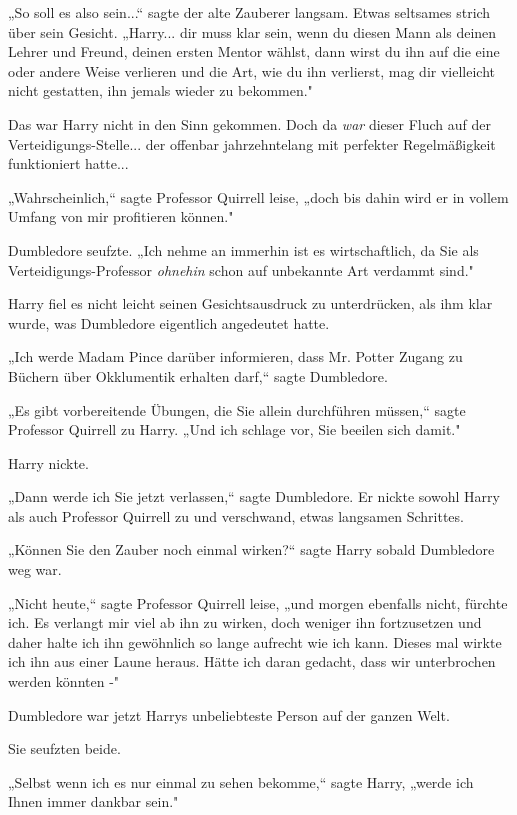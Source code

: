 {„So soll es also sein...“ sagte der alte Zauberer langsam. Etwas seltsames strich über sein Gesicht. „Harry... dir muss klar sein, wenn du diesen Mann als deinen Lehrer und Freund, deinen ersten Mentor wählst, dann wirst du ihn auf die eine oder andere Weise verlieren und die Art, wie du ihn verlierst, mag dir vielleicht nicht gestatten, ihn jemals wieder zu bekommen."

Das war Harry nicht in den Sinn gekommen. Doch da \emph{war} dieser Fluch auf der Verteidigungs-Stelle... der offenbar jahrzehntelang mit perfekter Regelmäßigkeit funktioniert hatte...

„Wahrscheinlich,“ sagte Professor Quirrell leise, „doch bis dahin wird er in vollem Umfang von mir profitieren können."

Dumbledore seufzte. „Ich nehme an immerhin ist es wirtschaftlich, da Sie als Verteidigungs-Professor \emph{ohnehin} schon auf unbekannte Art verdammt sind."

Harry fiel es nicht leicht seinen Gesichtsausdruck zu unterdrücken, als ihm klar wurde, was Dumbledore eigentlich angedeutet hatte.

„Ich werde Madam Pince darüber informieren, dass Mr. Potter Zugang zu Büchern über Okklumentik erhalten darf,“ sagte Dumbledore.

„Es gibt vorbereitende Übungen, die Sie allein durchführen müssen,“ sagte Professor Quirrell zu Harry. „Und ich schlage vor, Sie beeilen sich damit."

Harry nickte.

„Dann werde ich Sie jetzt verlassen,“ sagte Dumbledore. Er nickte sowohl Harry als auch Professor Quirrell zu und verschwand, etwas langsamen Schrittes.

„Können Sie den Zauber noch einmal wirken?“ sagte Harry sobald Dumbledore weg war.

„Nicht heute,“ sagte Professor Quirrell leise, „und morgen ebenfalls nicht, fürchte ich. Es verlangt mir viel ab ihn zu wirken, doch weniger ihn fortzusetzen und daher halte ich ihn gewöhnlich so lange aufrecht wie ich kann. Dieses mal wirkte ich ihn aus einer Laune heraus. Hätte ich daran gedacht, dass wir unterbrochen werden könnten -"

Dumbledore war jetzt Harrys unbeliebteste Person auf der ganzen Welt.

Sie seufzten beide.

„Selbst wenn ich es nur einmal zu sehen bekomme,“ sagte Harry, „werde ich Ihnen immer dankbar sein."

}
